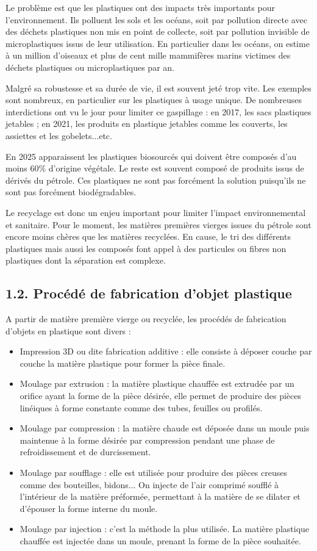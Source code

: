 \documentclass[10pt]{article}
\begin{document}
Le problème est que les plastiques ont des impacts très importants pour l'environnement. Ils polluent les sols et les océans, soit par pollution directe avec des déchets plastiques non mis en point de collecte, soit par pollution invisible de microplastiques issus de leur utilisation. En particulier dans les océans, on estime à un million d'oiseaux et plus de cent mille mammifères marins victimes des déchets plastiques ou microplastiques par an.

Malgré sa robustesse et sa durée de vie, il est souvent jeté trop vite. Les exemples sont nombreux, en particulier sur les plastiques à usage unique. De nombreuses interdictions ont vu le jour pour limiter ce gaspillage : en 2017, les sacs plastiques jetables ; en 2021, les produits en plastique jetables comme les couverts, les assiettes et les gobelets...etc.

En 2025 apparaissent les plastiques biosourcés qui doivent être composés d'au moins 60\% d'origine végétale. Le reste est souvent composé de produits issus de dérivés du pétrole. Ces plastiques ne sont pas forcément la solution puisqu'ils ne sont pas forcément biodégradables.

Le recyclage est donc un enjeu important pour limiter l'impact environnemental et sanitaire. Pour le moment, les matières premières vierges issues du pétrole sont encore moins chères que les matières recyclées. En cause, le tri des différents plastiques mais aussi les composés font appel à des particules ou fibres non plastiques dont la séparation est complexe.

\subsection*{1.2. Procédé de fabrication d'objet plastique}
A partir de matière première vierge ou recyclée, les procédés de fabrication d'objets en plastique sont divers :

\begin{itemize}
  \item[-] Impression 3D ou dite fabrication additive : elle consiste à déposer couche par couche la matière plastique pour former la pièce finale.
  \item[-] Moulage par extrusion : la matière plastique chauffée est extrudée par un orifice ayant la forme de la pièce désirée, elle permet de produire des pièces linéiques à forme constante comme des tubes, feuilles ou profilés.
  \item[-] Moulage par compression : la matière chaude est déposée dans un moule puis maintenue à la forme désirée par compression pendant une phase de refroidissement et de durcissement.
  \item[-] Moulage par soufflage : elle est utilisée pour produire des pièces creuses comme des bouteilles, bidons... On injecte de l'air comprimé soufflé à l'intérieur de la matière préformée, permettant à la matière de se dilater et d'épouser la forme interne du moule.
  \item[-] Moulage par injection : c'est la méthode la plus utilisée. La matière plastique chauffée est injectée dans un moule, prenant la forme de la pièce souhaitée.
\end{itemize}
\end{document}
